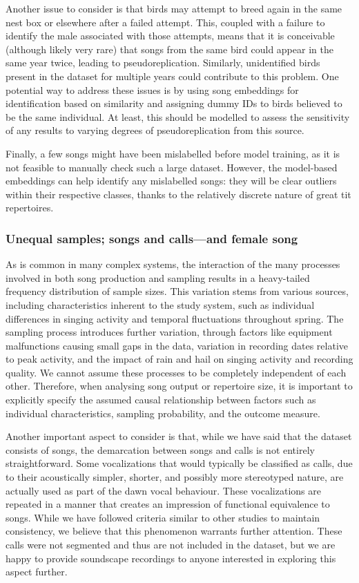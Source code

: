 Another issue to consider is that birds may attempt to breed again in the same nest box or elsewhere after a failed attempt. This, coupled with a failure to identify the male associated with those attempts, means that it is conceivable (although likely very rare) that songs from the same bird could appear in the same year twice, leading to pseudoreplication. Similarly, unidentified birds present in the dataset for multiple years could contribute to this problem. One potential way to address these issues is by using song embeddings for identification based on similarity and assigning dummy IDs to birds believed to be the same individual. At least, this should be modelled to assess the sensitivity of any results to varying degrees of pseudoreplication from this source.

Finally, a few songs might have been mislabelled before model training, as it is not feasible to manually check such a large dataset. However, the model-based embeddings can help identify any mislabelled songs: they will be clear outliers within their respective classes, thanks to the relatively discrete nature of great tit repertoires.


\subsubsection{Unequal samples; songs and calls---and female song}

As is common in many complex systems, the interaction of the many processes involved in both song production and sampling results in a heavy-tailed frequency distribution of sample sizes. This variation stems from various sources, including characteristics inherent to the study system, such as individual differences in singing activity and temporal fluctuations throughout spring. The sampling process introduces further variation, through factors like equipment malfunctions causing small gaps in the data, variation in recording dates relative to peak activity, and the impact of rain and hail on singing activity and recording quality. We cannot assume these processes to be completely independent of each other. Therefore, when analysing song output or repertoire size, it is important to explicitly specify the assumed causal relationship between factors such as individual characteristics, sampling probability, and the outcome measure.

Another important aspect to consider is that, while we have said that the dataset consists of songs, the demarcation between songs and calls is not entirely straightforward. Some vocalizations that would typically be classified as calls, due to their acoustically simpler, shorter, and possibly more stereotyped nature, are actually used as part of the dawn vocal behaviour. These vocalizations are repeated in a manner that creates an impression of functional equivalence to songs. While we have followed criteria similar to other studies \parencite{baker1986, fayet2014, krebs1978, rivera-gutierrez2010a} to maintain consistency, we believe that this phenomenon warrants further attention. These calls were not segmented and thus are not included in the dataset, but we are happy to provide soundscape recordings to anyone interested in exploring this aspect further.

